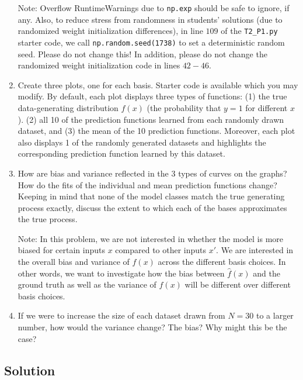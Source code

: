 \documentclass[submit]{harvardml}
\begin{document}
\begin{problem}
\begin{enumerate}
   Note: Overflow RuntimeWarnings due to \verb|np.exp| should be safe to ignore, if any. Also, to reduce stress from randomness in students' solutions (due to randomized weight initialization differences), in line $109$ of the \verb|T2_P1.py| starter code, we call \verb|np.random.seed(1738)| to set a deterministic random seed. Please do not change this! In addition, please do not change the randomized weight initialization code in lines $42-46$.

\item Create three plots, one for each basis. Starter code is available which you may modify.
By default, each plot displays three types of functions:
(1) the true data-generating distribution $f(x)$ (the probability that $y=1$ for different $x$).
(2) all 10 of the prediction functions learned from each randomly drawn dataset, and
(3) the mean of the 10 prediction functions.
Moreover, each plot also displays 1 of the randomly generated datasets and highlights the corresponding prediction function learned by this dataset.

\item How are bias and variance reflected in the 3 types of curves on
  the graphs?  How do the fits of the individual and mean prediction
  functions change?  Keeping in mind that none of the model classes
  match the true generating process exactly, discuss the extent to
  which each of the bases approximates the true process.

  Note: In this problem, we are not interested in whether the model is
  more biased for certain inputs $x$ compared to other inputs $x'$.
  We are interested in the overall bias and variance of $\hat{f}(x)$
  across the different basis choices. In other words, we want to investigate how the bias between $\hat{f}(x)$ and the ground truth as well as the variance of $\hat{f}(x)$ will be different over different basis choices. 

\item If we were to increase the size of each dataset drawn from $N = 30$ to a larger number, how would the variance change? The bias?   Why might this be the case?

\end{enumerate}

\end{problem}


\newpage

\subsection*{Solution}
\end{document}
